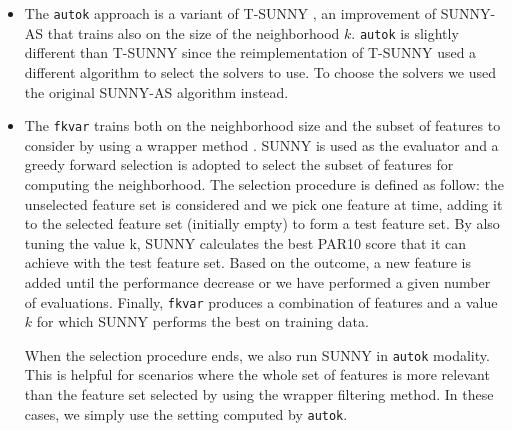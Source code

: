 \documentclass[tablecaption=bottom,wcp]{jmlr} %
\begin{document}
\begin{itemize}
\item The \texttt{autok} approach is a variant of T-SUNNY \citep{DBLP:conf/lion/LindauerBH16}, 
an improvement of SUNNY-AS that trains also on the size of the neighborhood 
$k$. \texttt{autok} is slightly different than T-SUNNY since the 
reimplementation of T-SUNNY used a different algorithm to select the 
solvers to use. To choose the solvers we used the original SUNNY-AS 
algorithm instead.


  \item The \texttt{fkvar} trains both on the neighborhood size and 
the subset of features to consider by using a wrapper method 
\citep{Kohavi97wrappersfor}. SUNNY is used as the evaluator and a 
greedy forward selection is adopted to select the subset of features for 
computing the neighborhood.
% 
The selection procedure is defined as follow: 
the unselected feature set is considered and we pick one feature at time, 
adding it to the selected feature set (initially empty) to form a test 
feature set. By also tuning the value k, SUNNY calculates the best PAR10 score 
that it can achieve with the test feature set. Based on the outcome, a new 
feature is added until the performance decrease or we have performed a given 
number of evaluations. Finally, \texttt{fkvar} 
produces a combination of features and a value $k$ for which SUNNY performs the 
best on training data.

When the selection procedure ends, we also run SUNNY in %
\texttt{autok} modality. This is helpful
for scenarios where the whole set of features is more relevant than the 
feature set selected by using the wrapper filtering method. 
In these cases, we simply use the setting computed by \texttt{autok}.
\end{itemize}
 
\end{document}
